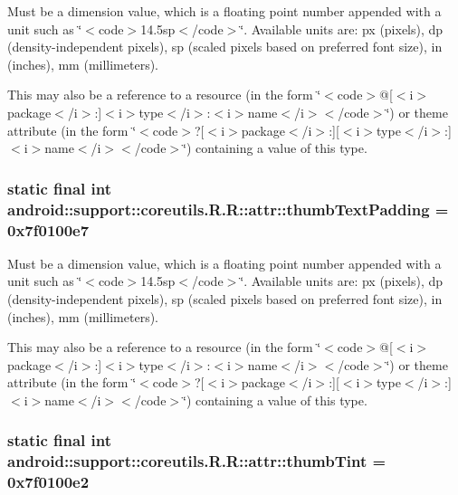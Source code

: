 Must be a dimension value, which is a floating point number appended with a unit such as \char`\"{}$<$code$>$14.5sp$<$/code$>$\char`\"{}. Available units are: px (pixels), dp (density-independent pixels), sp (scaled pixels based on preferred font size), in (inches), mm (millimeters). 

This may also be a reference to a resource (in the form \char`\"{}$<$code$>$@\mbox{[}$<$i$>$package$<$/i$>$:\mbox{]}$<$i$>$type$<$/i$>$:$<$i$>$name$<$/i$>$$<$/code$>$\char`\"{}) or theme attribute (in the form \char`\"{}$<$code$>$?\mbox{[}$<$i$>$package$<$/i$>$:\mbox{]}\mbox{[}$<$i$>$type$<$/i$>$:\mbox{]}$<$i$>$name$<$/i$>$$<$/code$>$\char`\"{}) containing a value of this type. \hypertarget{classandroid_1_1support_1_1coreutils_1_1_r_1_1attr_074a9e5d1c6367df761561ea4feba69c}{
\subsubsection[{thumbTextPadding}]{\setlength{\rightskip}{0pt plus 5cm}static final int android::support::coreutils.R.R::attr::thumbTextPadding = 0x7f0100e7}}
\label{classandroid_1_1support_1_1coreutils_1_1_r_1_1attr_074a9e5d1c6367df761561ea4feba69c}


Must be a dimension value, which is a floating point number appended with a unit such as \char`\"{}$<$code$>$14.5sp$<$/code$>$\char`\"{}. Available units are: px (pixels), dp (density-independent pixels), sp (scaled pixels based on preferred font size), in (inches), mm (millimeters). 

This may also be a reference to a resource (in the form \char`\"{}$<$code$>$@\mbox{[}$<$i$>$package$<$/i$>$:\mbox{]}$<$i$>$type$<$/i$>$:$<$i$>$name$<$/i$>$$<$/code$>$\char`\"{}) or theme attribute (in the form \char`\"{}$<$code$>$?\mbox{[}$<$i$>$package$<$/i$>$:\mbox{]}\mbox{[}$<$i$>$type$<$/i$>$:\mbox{]}$<$i$>$name$<$/i$>$$<$/code$>$\char`\"{}) containing a value of this type. \hypertarget{classandroid_1_1support_1_1coreutils_1_1_r_1_1attr_197863eb8627310239e7a262452c7217}{
\subsubsection[{thumbTint}]{\setlength{\rightskip}{0pt plus 5cm}static final int android::support::coreutils.R.R::attr::thumbTint = 0x7f0100e2}}
\label{classandroid_1_1support_1_1coreutils_1_1_r_1_1attr_197863eb8627310239e7a262452c7217}


